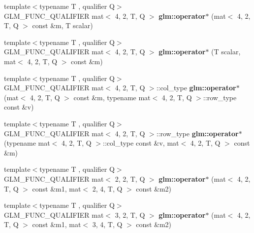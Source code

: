 \begin{DoxyCompactItemize}
\item 
\mbox{\label{type__mat4x2_8inl_a09d03d89ff90db594947d1f1343e1b91}} 
{\footnotesize template$<$typename T , qualifier Q$>$ }\\G\+L\+M\+\_\+\+F\+U\+N\+C\+\_\+\+Q\+U\+A\+L\+I\+F\+I\+ER mat$<$ 4, 2, T, Q $>$ {\bfseries glm\+::operator$\ast$} (mat$<$ 4, 2, T, Q $>$ const \&m, T scalar)
\item 
\mbox{\label{type__mat4x2_8inl_a4d746e28b9997c4e8223605503469343}} 
{\footnotesize template$<$typename T , qualifier Q$>$ }\\G\+L\+M\+\_\+\+F\+U\+N\+C\+\_\+\+Q\+U\+A\+L\+I\+F\+I\+ER mat$<$ 4, 2, T, Q $>$ {\bfseries glm\+::operator$\ast$} (T scalar, mat$<$ 4, 2, T, Q $>$ const \&m)
\item 
\mbox{\label{type__mat4x2_8inl_ab725c78a04cf5086bee0142b78db06b7}} 
{\footnotesize template$<$typename T , qualifier Q$>$ }\\G\+L\+M\+\_\+\+F\+U\+N\+C\+\_\+\+Q\+U\+A\+L\+I\+F\+I\+ER mat$<$ 4, 2, T, Q $>$\+::col\+\_\+type {\bfseries glm\+::operator$\ast$} (mat$<$ 4, 2, T, Q $>$ const \&m, typename mat$<$ 4, 2, T, Q $>$\+::row\+\_\+type const \&v)
\item 
\mbox{\label{type__mat4x2_8inl_a02482786cbe88dfee0958c191208d920}} 
{\footnotesize template$<$typename T , qualifier Q$>$ }\\G\+L\+M\+\_\+\+F\+U\+N\+C\+\_\+\+Q\+U\+A\+L\+I\+F\+I\+ER mat$<$ 4, 2, T, Q $>$\+::row\+\_\+type {\bfseries glm\+::operator$\ast$} (typename mat$<$ 4, 2, T, Q $>$\+::col\+\_\+type const \&v, mat$<$ 4, 2, T, Q $>$ const \&m)
\item 
\mbox{\label{type__mat4x2_8inl_ad5c9c12705ae119e5492249507e7c6ca}} 
{\footnotesize template$<$typename T , qualifier Q$>$ }\\G\+L\+M\+\_\+\+F\+U\+N\+C\+\_\+\+Q\+U\+A\+L\+I\+F\+I\+ER mat$<$ 2, 2, T, Q $>$ {\bfseries glm\+::operator$\ast$} (mat$<$ 4, 2, T, Q $>$ const \&m1, mat$<$ 2, 4, T, Q $>$ const \&m2)
\item 
\mbox{\label{type__mat4x2_8inl_aba08d8f9ada878e34444615572183029}} 
{\footnotesize template$<$typename T , qualifier Q$>$ }\\G\+L\+M\+\_\+\+F\+U\+N\+C\+\_\+\+Q\+U\+A\+L\+I\+F\+I\+ER mat$<$ 3, 2, T, Q $>$ {\bfseries glm\+::operator$\ast$} (mat$<$ 4, 2, T, Q $>$ const \&m1, mat$<$ 3, 4, T, Q $>$ const \&m2)

\end{DoxyCompactItemize}
